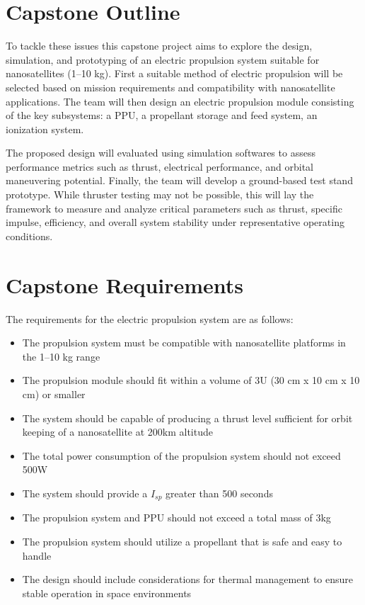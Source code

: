 \section{Capstone Outline}
To tackle these issues this capstone project aims to explore the design, simulation, and prototyping of an electric propulsion system suitable for nanosatellites (1–10 kg). First a suitable method of electric propulsion will be selected based on mission requirements and compatibility with nanosatellite applications. The team will then design an electric propulsion module consisting of the key subsystems: a \ac{PPU}, a propellant storage and feed system, an ionization system.

The proposed design will evaluated using simulation softwares to assess performance metrics such as thrust, electrical performance, and orbital maneuvering potential. Finally, the team will develop a ground-based test stand prototype. While thruster testing may not be possible, this will lay the framework to measure and analyze critical parameters such as thrust, specific impulse, efficiency, and overall system stability under representative operating conditions.

\section{Capstone Requirements}
The requirements for the electric propulsion system are as follows:
\begin{itemize}
    \item The propulsion system must be compatible with nanosatellite platforms in the 1–10 kg range
    \item The propulsion module should fit within a volume of 3U (30 cm x 10 cm x 10 cm) or smaller
    \item The system should be capable of producing a thrust level sufficient for orbit keeping of a nanosatellite at 200km altitude
    \item The total power consumption of the propulsion system should not exceed 500W
    \item The system should provide a $I_{sp}$ greater than 500 seconds
    \item The propulsion system and \ac{PPU} should not exceed a total mass of 3kg
    \item The propulsion system should utilize a propellant that is safe and easy to handle
    \item The design should include considerations for thermal management to ensure stable operation in space environments
\end{itemize}

